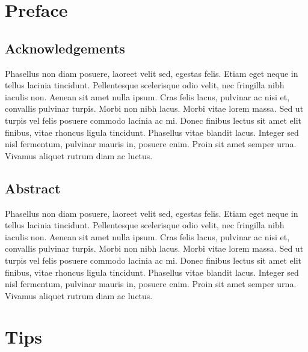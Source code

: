 \documentclass[
  letterpaper,
  oneside]{scrbook}
\begin{document}
\hypertarget{preface}{%
\chapter{Preface}\label{preface}}

\hypertarget{acknowledgements}{%
\section*{Acknowledgements}\label{acknowledgements}}


Phasellus non diam posuere, laoreet velit sed, egestas felis. Etiam eget
neque in tellus lacinia tincidunt. Pellentesque scelerisque odio velit,
nec fringilla nibh iaculis non. Aenean sit amet nulla ipsum. Cras felis
lacus, pulvinar ac nisi et, convallis pulvinar turpis. Morbi non nibh
lacus. Morbi vitae lorem massa. Sed ut turpis vel felis posuere commodo
lacinia ac mi. Donec finibus lectus sit amet elit finibus, vitae rhoncus
ligula tincidunt. Phasellus vitae blandit lacus. Integer sed nisl
fermentum, pulvinar mauris in, posuere enim. Proin sit amet semper urna.
Vivamus aliquet rutrum diam ac luctus.

\hypertarget{abstract}{%
\section*{Abstract}\label{abstract}}


Phasellus non diam posuere, laoreet velit sed, egestas felis. Etiam eget
neque in tellus lacinia tincidunt. Pellentesque scelerisque odio velit,
nec fringilla nibh iaculis non. Aenean sit amet nulla ipsum. Cras felis
lacus, pulvinar ac nisi et, convallis pulvinar turpis. Morbi non nibh
lacus. Morbi vitae lorem massa. Sed ut turpis vel felis posuere commodo
lacinia ac mi. Donec finibus lectus sit amet elit finibus, vitae rhoncus
ligula tincidunt. Phasellus vitae blandit lacus. Integer sed nisl
fermentum, pulvinar mauris in, posuere enim. Proin sit amet semper urna.
Vivamus aliquet rutrum diam ac luctus.


\hypertarget{tips}{%
\chapter{Tips}\label{tips}}
\end{document}
